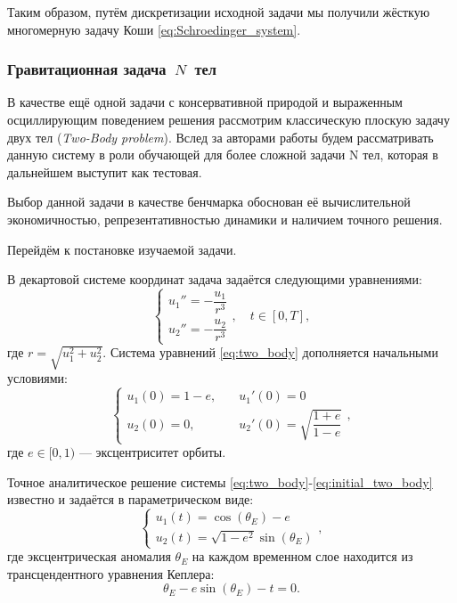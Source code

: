 Таким образом, путём дискретизации исходной задачи мы получили жёсткую многомерную задачу Коши \eqref{eq:Schroedinger_system}.

\subsubsection{Гравитационная задача~$N$~тел}

В качестве ещё одной задачи с консервативной природой и выраженным осциллирующим поведением решения рассмотрим классическую плоскую задачу двух тел (\textit{Two-Body problem}). Вслед за авторами работы \cite{Anastassi2025} будем рассматривать данную систему в роли обучающей для более сложной задачи N тел, которая в дальнейшем выступит как тестовая.

Выбор данной задачи в качестве бенчмарка обоснован её вычислительной экономичностью, репрезентативностью динамики и наличием точного решения.

Перейдём к постановке изучаемой задачи.

В декартовой системе координат задача задаётся следующими уравнениями:
\begin{equation} \label{eq:two_body}
	\begin{cases}
		u_1'' = -\dfrac{u_1}{r^3} \\
		u_2'' = -\dfrac{u_2}{r^3}
	\end{cases}, \quad t \in [0, T],
\end{equation}
где $r = \sqrt{u_1^2 + u_2^2}$.
Система уравнений \eqref{eq:two_body} дополняется начальными условиями:
\begin{equation} \label{eq:initial_two_body}
	\begin{cases}
		u_1(0) = 1 - e, \quad & u_1'(0) = 0 \\
		u_2(0) = 0, \quad & u_2'(0) = \sqrt{\dfrac{1+e}{1-e}}
	\end{cases},
\end{equation}
где $e \in [0, 1)$ — эксцентриситет орбиты.

Точное аналитическое решение системы \eqref{eq:two_body}-\eqref{eq:initial_two_body} известно и задаётся в параметрическом виде:
\begin{equation} \label{eq:two_body_exact}
	\begin{cases}
		u_1(t) = \cos(\theta_E) - e \\
		u_2(t) = \sqrt{1 - e^2} \sin(\theta_E)
	\end{cases},
\end{equation}
где эксцентрическая аномалия $\theta_E$ на каждом временном слое находится из трансцендентного уравнения Кеплера:
\begin{equation*}
	\theta_E - e \sin(\theta_E) - t = 0.
\end{equation*}

